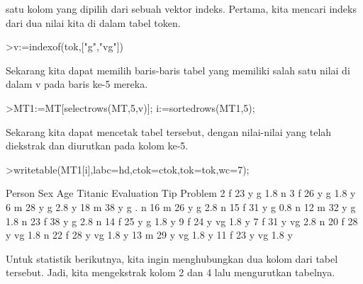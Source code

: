 \documentclass{article}
\newenvironment{eulernotebook}{\par}{\par}
\newenvironment{eulercomment}{\par\medskip}{\par\medskip}
\begin{document}
\begin{eulernotebook}
\begin{eulercomment}
satu kolom yang dipilih dari sebuah vektor indeks. Pertama, kita
mencari indeks dari dua nilai kita di dalam tabel token.
\end{eulercomment}
\begin{eulerprompt}
>v:=indexof(tok,["g","vg"])
\end{eulerprompt}
\begin{euleroutput}
  [5,  6]
\end{euleroutput}
\begin{eulercomment}
Sekarang kita dapat memilih baris-baris tabel yang memiliki salah satu
nilai di dalam v pada baris ke-5 mereka.
\end{eulercomment}
\begin{eulerprompt}
>MT1:=MT[selectrows(MT,5,v)]; i:=sortedrows(MT1,5);
\end{eulerprompt}
\begin{eulercomment}
Sekarang kita dapat mencetak tabel tersebut, dengan nilai-nilai yang
telah diekstrak dan diurutkan pada kolom ke-5.
\end{eulercomment}
\begin{eulerprompt}
>writetable(MT1[i],labc=hd,ctok=ctok,tok=tok,wc=7);
\end{eulerprompt}
\begin{euleroutput}
   Person    Sex    Age Titanic Evaluation    Tip Problem
        2      f     23       y          g    1.8       n
        3      f     26       y          g    1.8       y
        6      m     28       y          g    2.8       y
       18      m     38       y          g      .       n
       16      m     26       y          g    2.8       n
       15      f     31       y          g    0.8       n
       12      m     32       y          g    1.8       n
       23      f     38       y          g    2.8       n
       14      f     25       y          g    1.8       y
        9      f     24       y         vg    1.8       y
        7      f     31       y         vg    2.8       n
       20      f     28       y         vg    1.8       n
       22      f     28       y         vg    1.8       y
       13      m     29       y         vg    1.8       y
       11      f     23       y         vg    1.8       y
\end{euleroutput}
\begin{eulercomment}
Untuk statistik berikutnya, kita ingin menghubungkan dua kolom dari
tabel tersebut. Jadi, kita mengekstrak kolom 2 dan 4 lalu mengurutkan
tabelnya.
\end{eulercomment}
\begin{eulerprompt}

\end{eulerprompt}
\end{eulernotebook}
\end{document}
